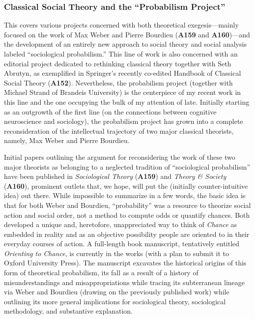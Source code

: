 \documentclass[a4paper,11pt]{extarticle}
\begin{document}
\subsubsection*{Classical Social Theory and the ``Probabilism Project''}
This covers various projects concerned with both theoretical exegesis---mainly focused on the work of Max Weber and Pierre Bourdieu (\textbf{A159} and \textbf{A160})---and the development of an entirely new approach to social theory and social analysis labeled ``sociological probabilism.'' This line of work is also concerned with an editorial project dedicated to rethinking classical theory together with Seth Abrutyn, as exemplified in Springer's recently co-edited Handbook of Classical Social Theory (\textbf{A152}). Nevertheless, the probabilism project (together with Michael Strand of Brandeis University) is the centerpiece of my recent work in this line and the one occupying the bulk of my attention of late. Initially starting as an outgrowth of the first line (on the connections between cognitive neuroscience and sociology), the probabilism project has grown into a complete reconsideration of the intellectual trajectory of two major classical theorists, namely, Max Weber and Pierre Bourdieu. 

Initial papers outlining the argument for reconsidering the work of these two major theorists as belonging to a neglected tradition of ``sociological probabilism'' have been published in \textit{Sociological Theory} (\textbf{A159}) and \textit{Theory \& Society} (\textbf{A160}), prominent outlets that, we hope, will put the (initially counter-intuitive idea) out there. While impossible to summarize in a few words, the basic idea is that for both Weber and Bourdieu, ``probability'' was a resource to theorize social action and social order, not a method to compute odds or quantify chances. Both developed a unique and, heretofore, unappreciated way to think of \textit{Chance} as embedded in reality and as an objective possibility people are oriented to in their everyday courses of action. A full-length book manuscript, tentatively entitled \textit{Orienting to Chance}, is currently in the works (with a plan to submit it to Oxford University Press). The manuscript excavates the historical origins of this form of theoretical probabilism, its fall as a result of a history of misunderstandings and misappropriations while tracing its subterranean lineage via Weber and Bourdieu (drawing on the previously published work) while outlining its more general implications for sociological theory, sociological methodology, and substantive explanation. 
\end{document}
